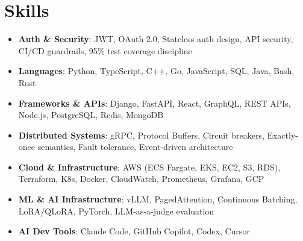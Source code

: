 \documentclass[letterpaper,11pt]{article}
\newcommand{\resumeSubHeadingListStart}{\begin{itemize}[leftmargin=0.15in, label={}]}
\newcommand{\resumeSubHeadingListEnd}{\end{itemize}}
\newcommand{\resumeSkillHeading}[2]{%
  \item\small{\textbf{#1}: #2 \vspace{-9pt}}%
}
\begin{document}
\section{Skills}
  \resumeSubHeadingListStart
    \resumeSkillHeading{Auth \& Security}{JWT, OAuth 2.0, Stateless auth design, API security, CI/CD guardrails, 95\% test coverage discipline}
    \resumeSkillHeading{Languages}{Python, TypeScript, C++, Go, JavaScript, SQL, Java, Bash, Rust}
    \resumeSkillHeading{Frameworks \& APIs}{Django, FastAPI, React, GraphQL, REST APIs, Node.js, PostgreSQL, Redis, MongoDB}
    \resumeSkillHeading{Distributed Systems}{gRPC, Protocol Buffers, Circuit breakers, Exactly-once semantics, Fault tolerance, Event-driven architecture}
    \resumeSkillHeading{Cloud \& Infrastructure}{AWS (ECS Fargate, EKS, EC2, S3, RDS), Terraform, K8s, Docker, CloudWatch, Prometheus, Grafana, GCP}
    \resumeSkillHeading{ML \& AI Infrastructure}{vLLM, PagedAttention, Continuous Batching, LoRA/QLoRA, PyTorch, LLM-as-a-judge evaluation}
    \resumeSkillHeading{AI Dev Tools}{Claude Code, GitHub Copilot, Codex, Cursor}
  \resumeSubHeadingListEnd
\end{document}
